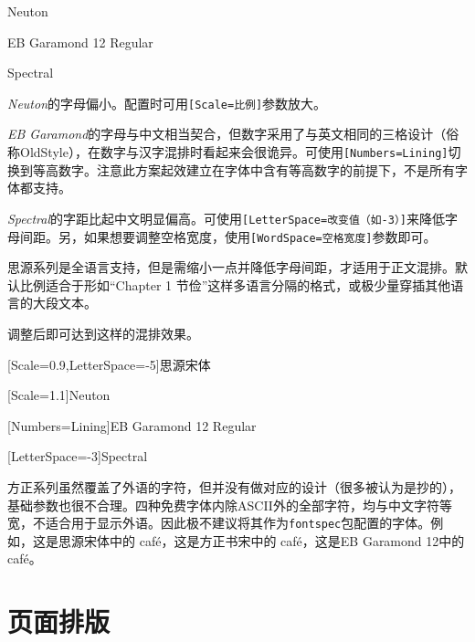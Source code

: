 \documentclass[10pt,openany]{book}
\begin{document}
\begin{sloppypar}
\begin{adjustwidth}{2em}{2em}
        Neuton\testtext

        EB Garamond 12 Regular\testtext

        Spectral\testtext

        \blankpar
    \end{adjustwidth}

    \emph{Neuton}的字母偏小。配置时可用\texttt{{[}Scale=比例{]}}参数放大。

    \emph{EB Garamond}的字母与中文相当契合，但数字采用了与英文相同的三格设计（俗称OldStyle），在数字与汉字混排时看起来会很诡异。可使用\texttt{{[}Numbers=Lining{]}}切换到等高数字。注意此方案起效建立在字体中含有等高数字的前提下，不是所有字体都支持。

    \emph{Spectral}的字距比起中文明显偏高。可使用\texttt{{[}LetterSpace=改变值（如-3）{]}}来降低字母间距。另，如果想要调整空格宽度，使用\texttt{{[}WordSpace=空格宽度{]}}参数即可。

    思源系列是全语言支持，但是需缩小一点并降低字母间距，才适用于正文混排。默认比例适合于形如“Chapter 1 节俭”这样多语言分隔的格式，或极少量穿插其他语言的大段文本。

    调整后即可达到这样的混排效果。

    \begin{adjustwidth}{2em}{2em}
        \large\blankpar

        [Scale=0.9,LetterSpace=-5]思源宋体\testtext

        [Scale=1.1]Neuton\testtext

        [Numbers=Lining]EB Garamond 12 Regular\testtext

        [LetterSpace=-3]Spectral\testtext

        \blankpar
    \end{adjustwidth}

    方正系列虽然覆盖了外语的字符，但并没有做对应的设计（很多被认为是抄的），基础参数也很不合理。四种免费字体内除ASCII外的全部字符，均与中文字符等宽，不适合用于显示外语。因此极不建议将其作为\texttt{fontspec}包配置的字体。例如，这是思源宋体中的{ café}，这是方正书宋中的{ café}，这是EB Garamond 12中的{ café}。

    \chapter{页面排版}


\end{sloppypar}
\end{document}

